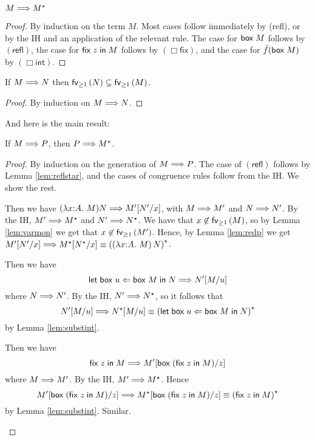 \begin{lem}
  \label{lem:reflstar}
  $M \mathrel{\Longrightarrow}{} M^\star$
\end{lem}
\begin{proof}
  By induction on the term $M$. Most cases follow immediately by
  (\textsf{refl}), or by the IH and an application of the relevant
  rule. The case for $\mathsf{box\;}M$ follows by $(\textsf{refl})$, the
  case for $\mathsf{fix\;} z \mathsf{\;in\;} M$ follows by $(\Box\textsf{fix})$, and
  the case for $\tilde f(\mathsf{box\;}M)$ by $(\Box\textsf{int})$.
\end{proof}

\begin{lem}
  \label{lem:varmon}
  If $M \mathrel{\Longrightarrow}{} N$ then $\mathsf{fv}_{\geq 1}\left(N\right) \subseteq \mathsf{fv}_{\geq 1}\left(M\right)$.
\end{lem}
\begin{proof}
  By induction on $M \mathrel{\Longrightarrow}{} N$.
\end{proof}


\noindent And here is the main result:

\begin{thm}
  \label{thm:mainredp}
  If $M \mathrel{\Longrightarrow} P$, then $P \mathrel{\Longrightarrow} M^\star$.
\end{thm}

\begin{proof}
  By induction on the generation of $M \mathrel{\Longrightarrow} P$. The case of
  $(\textsf{refl})$ follows by Lemma \ref{lem:reflstar}, and the
  cases of congruence rules follow from the IH. We show the rest.
  \begin{indproof}
    \indcase{$\rightarrow\beta$}
      Then we have $(\lambda x{:}A.\ M)N \mathrel{\Longrightarrow} M'[N'/x]$, with $M
      \mathrel{\Longrightarrow} M'$ and $N \mathrel{\Longrightarrow} N'$. By the IH, $M' \mathrel{\Longrightarrow} M^\star$
      and $N' \mathrel{\Longrightarrow} N^\star$. We have that $x \not\in \mathsf{fv}_{\geq 1}\left(M\right)$,
      so by Lemma \ref{lem:varmon} we get that $x \not\in
      \mathsf{fv}_{\geq 1}\left(M'\right)$. Hence, by Lemma \ref{lem:redp} we get $M'[N'/x]
      \mathrel{\Longrightarrow} M^\star[N^\star/x] \equiv \left(\left(\lambda x{:}A.\
      M\right)N\right)^\star$.

    \indcase{$\Box\beta$}
      Then we have \[
	\mathsf{let\;box\;} u \Leftarrow \mathsf{box\;}M \mathsf{\;in\;} N \mathrel{\Longrightarrow} N'[M/u]
      \] where $N \mathrel{\Longrightarrow} N'$. By the IH, $N' \mathrel{\Longrightarrow} N^\star$, so it
      follows that \[
	N'[M/u] \mathrel{\Longrightarrow} N^\star[M/u] \equiv \left(
	\mathsf{let\;box\;} u \Leftarrow \mathsf{box\;}M \mathsf{\;in\;} N\right)^\star
      \] by Lemma \ref{lem:substint}.

      Then we have \[
	\mathsf{fix\;} z \mathsf{\;in\;} M
	  \mathrel{\Longrightarrow}{}
	M'[\mathsf{box\;}(\mathsf{fix\;} z \mathsf{\;in\;} M)/z]
      \] where $M \mathrel{\Longrightarrow}{} M'$. By the IH, $M' \mathrel{\Longrightarrow}{} M^\star$.
      Hence \[
	M'[\mathsf{box\;}(\mathsf{fix\;} z \mathsf{\;in\;} M)/z]
	  \mathrel{\Longrightarrow}{}
	M^\star[\mathsf{box\;}(\mathsf{fix\;} z \mathsf{\;in\;} M)/z]
	  \equiv
	\left(\mathsf{fix\;} z \mathsf{\;in\;} M\right)^\star
      \] by Lemma \ref{lem:substint}.
      Similar.
  \end{indproof}
\end{proof}

